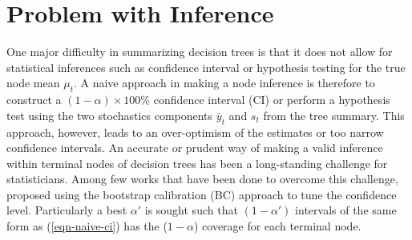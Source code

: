\section{Problem with Inference}
One major difficulty in summarizing decision trees is that it does not allow for statistical inferences such as confidence interval or hypothesis testing for the true node mean $\mu_t$. A naive approach in making a node inference is therefore to construct a $(1-\alpha) \times 100\%$ confidence interval (CI) or perform a hypothesis test using the two stochastics components $\bar{y}_t$ and $s_t$ from the tree summary. This approach, however, leads to an over-optimism of the estimates or too narrow confidence intervals. An accurate or prudent way of making a valid inference within terminal nodes of decision trees has been a long-standing challenge for statisticians. Among few works that have been done to overcome this challenge, \cite{loh2018subgroups} proposed using the bootstrap calibration (BC) approach \citep{loh1987calibrating, loh1991bootstrap} to tune the confidence level. Particularly a best $\alpha'$ is sought such that $(1-\alpha')$ intervals of the same form as (\ref{eqn-naive-ci}) has the ($1-\alpha$) coverage for each terminal node.


